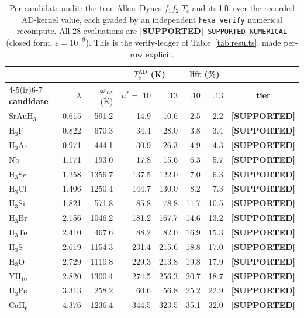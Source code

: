 \documentclass[11pt,a4paper]{article}
\providecommand{\tierGreen}{\textcolor{green!50!black}{\textbf{[SUPPORTED]}}}
\begin{document}
\begin{table}[h]
\centering
\small
\setlength{\tabcolsep}{4pt}
\begin{tabular}{lrr rr rr c}
\toprule
& & & \multicolumn{2}{c}{$T_c^{\mathrm{AD}}$ (K)}
    & \multicolumn{2}{c}{lift (\%)} & \\
\cmidrule(lr){4-5}\cmidrule(lr){6-7}
\textbf{candidate} & $\lambda$ & $\omega_{\log}$ (K)
  & $\mu^*{=}.10$ & $.13$ & $.10$ & $.13$ & \textbf{tier} \\
\midrule
SrAuH$_3$ & 0.615  & 591.2  & 14.9  & 10.6  & 2.5  & 2.2  & \tierGreen \\
H$_3$F    & 0.822  & 670.3  & 34.4  & 28.0  & 3.8  & 3.4  & \tierGreen \\
H$_3$As   & 0.971  & 444.1  & 30.9  & 26.3  & 4.9  & 4.3  & \tierGreen \\
Nb        & 1.171  & 193.0  & 17.8  & 15.6  & 6.3  & 5.7  & \tierGreen \\
H$_3$Se   & 1.258  & 1356.7 & 137.5 & 122.0 & 7.0  & 6.3  & \tierGreen \\
H$_3$Cl   & 1.406  & 1250.4 & 144.7 & 130.0 & 8.2  & 7.3  & \tierGreen \\
H$_3$Si   & 1.821  & 571.8  & 85.8  & 78.8  & 11.7 & 10.5 & \tierGreen \\
H$_3$Br   & 2.156  & 1046.2 & 181.2 & 167.7 & 14.6 & 13.2 & \tierGreen \\
H$_3$Te   & 2.410  & 467.6  & 88.2  & 82.0  & 16.9 & 15.3 & \tierGreen \\
H$_3$S    & 2.619  & 1154.3 & 231.4 & 215.6 & 18.8 & 17.0 & \tierGreen \\
H$_3$O    & 2.729  & 1110.8 & 229.3 & 213.8 & 19.8 & 17.9 & \tierGreen \\
YH$_{10}$ & 2.820  & 1300.4 & 274.5 & 256.3 & 20.7 & 18.7 & \tierGreen \\
H$_3$Po   & 3.313  & 258.2  & 60.6  & 56.8  & 25.2 & 22.9 & \tierGreen \\
CaH$_6$   & 4.376  & 1236.4 & 344.5 & 323.5 & 35.1 & 32.0 & \tierGreen \\
\bottomrule
\end{tabular}
\caption{Per-candidate audit: the true Allen--Dynes $f_1 f_2$ $T_c$ and its lift
over the recorded AD-kernel value, each graded by an independent
\texttt{hexa verify} numerical recompute. All $28$ evaluations are
\tierGreen\ \texttt{SUPPORTED-NUMERICAL} (closed form, $\varepsilon=10^{-9}$).
This is the verify-ledger of Table~\ref{tab:results}, made per-row explicit.}
\label{tab:audit}
\end{table}
\end{document}
